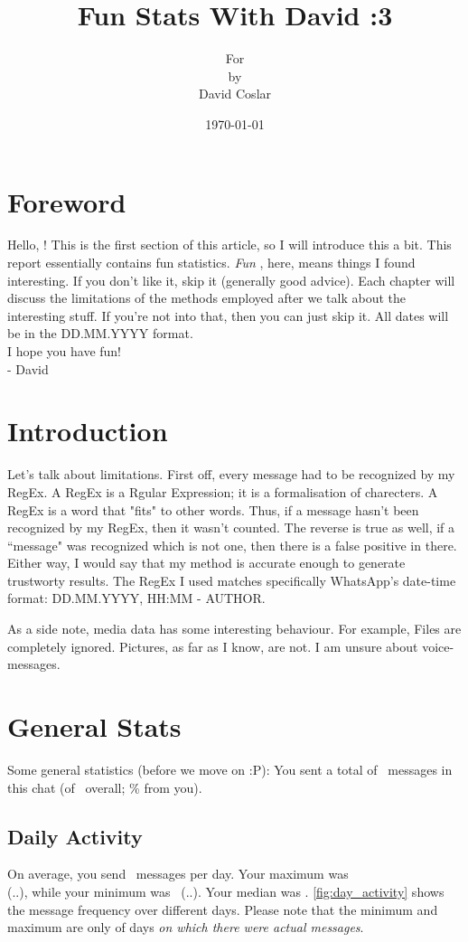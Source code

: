 \documentclass{WAReport}
\title{Fun Stats With David :3}
\author{For \Name\\by\\David Coslar} \date{\today}
\begin{document}
\maketitle

\section{Foreword}

Hello, \Name!
This is the first section of this article, so I will introduce this a bit. This report essentially contains fun statistics. \emph{Fun} , here, means things I found interesting. If you don't like it, skip it (generally good advice). Each chapter will discuss the limitations of the methods employed after we talk about the interesting stuff. If you're not into that, then you can just skip it. All dates will be in the DD.MM.YYYY format. \\
I hope you have fun! \\
- David 

\section{Introduction}
Let's talk about limitations. First off, every message had to be recognized by my RegEx. A RegEx is a Rgular Expression; it is a formalisation of charecters. A RegEx is a word that "fits" to other words. Thus, if a message hasn't been recognized by my RegEx, then it wasn't counted. The reverse is true as well, if a ``message" was recognized which is not one, then there is a false positive in there. Either way, I would say that my method is accurate enough to generate trustworty results. The RegEx I used matches specifically WhatsApp's date-time format: DD.MM.YYYY, HH:MM - AUTHOR.

As a side note, media data has some interesting behaviour. For example, Files are completely ignored. Pictures, as far as I know, are not. I am unsure about voice-messages.

\section{General Stats}
Some general statistics (before we move on :P): You sent a total of \TotalMsgCount \, messages in this chat (of \TotalMsgCountOverall \, overall; \TotalMsgCountRatio \% from you).

\subsection{Daily Activity}
On average, you send \AvgMsgCount \, messages per day. Your maximum was \MaxDayMsgCount \\(\MaxDayMsgCountDay.\MaxDayMsgCountMonth.\MaxDayMsgCountYear), while your minimum was \MinDayMsgCount \, (\MinDayMsgCountDay.\MinDayMsgCountMonth.\MinDayMsgCountYear). Your median was \MedianMsgCount. \autoref{fig:day_activity} shows the message frequency over different days. Please note that the minimum and maximum are only of days \emph{on which there were actual messages}.
\end{document}
